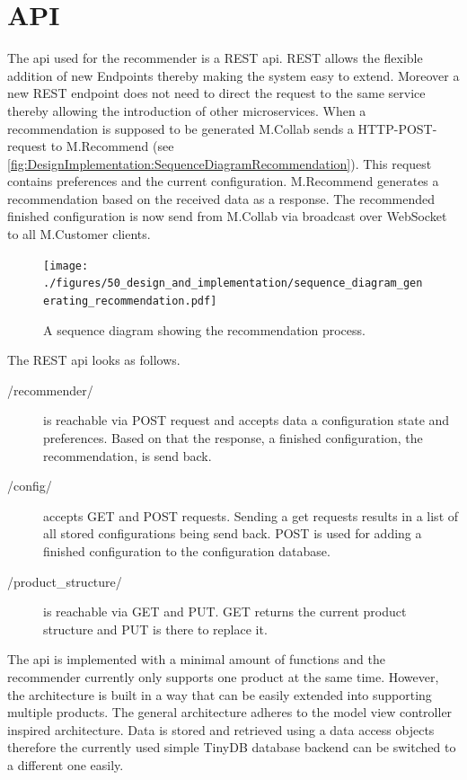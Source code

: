\section{API}
\label{sec:DesignImplementation:API}

The api used for the recommender is a REST api. REST allows the flexible addition of new Endpoints thereby making the system easy to extend. Moreover a new REST endpoint does not need to direct the request to the same service thereby allowing the introduction of other microservices.
When a recommendation is supposed to be generated M.Collab sends a HTTP-POST-request to M.Recommend (see \autoref{fig:DesignImplementation:SequenceDiagramRecommendation}). This request contains preferences and the current configuration. M.Recommend generates a recommendation based on the received data as a response. The recommended finished configuration is now send from  M.Collab via broadcast over WebSocket to all M.Customer clients. 

\begin{figure}
    \centering
    \texttt{[image: ./figures/50\_design\_and\_implementation/sequence\_diagram\_generating\_recommendation.pdf]}
    \caption{A sequence diagram showing the recommendation process.}
    \label{fig:DesignImplementation:SequenceDiagramRecommendation}
\end{figure}

The REST api looks as follows.

\begin{description}
    \item[/recommender/] is reachable via POST request and accepts data a configuration state and preferences. Based on that the response, a finished configuration, the recommendation, is send back.
    \item[/config/] accepts GET and POST requests. Sending a get requests results in a list of all stored configurations being send back. POST is used for adding a finished configuration to the configuration database.
    \item[/product\_structure/] is reachable via GET and PUT. GET returns the current product structure and PUT is there to replace it.
\end{description}

The api is implemented with a minimal amount of functions and the recommender currently only supports one product at the same time. However, the architecture is built in a way that can be easily extended into supporting multiple products.
The general architecture adheres to the model view controller inspired architecture.
Data is stored and retrieved using a data access objects therefore the currently used simple TinyDB database backend can be switched to a different one easily.

